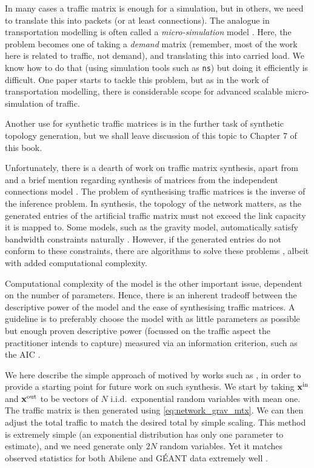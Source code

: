 In many cases a traffic matrix is enough for a simulation, but in others, 
we need to translate this into packets (or at least connections). The analogue in
transportation modelling is often called a {\em micro-simulation}
model \cite{Algers97Micro,Hoogendoorn01Vehicular}. 
Here, the problem becomes one of taking a {\em demand} matrix
(remember, most of the work here is related to traffic, not demand), and
translating this into carried load. We know how to do that (using
simulation tools such as \verb|ns|) but doing it efficiently is
difficult. One paper \cite{sommers11:_effic} starts to tackle this
problem, but as in the work of transportation modelling, there is
considerable scope for advanced scalable micro-simulation of traffic.

Another use for synthetic traffic matrices is in the further task of
synthetic topology generation, but we shall leave discussion of this
topic to Chapter 7 of this book.

Unfortunately, there is a dearth of work on traffic matrix synthesis,
apart from \cite{Nucci05TMSynth,Roughan05GravSynth} and a brief
mention regarding synthesis of matrices from the independent
connections model
\cite{Erramilli06IndepConn,Erramilli06IndepConnTech}. The problem of
synthesising traffic matrices is the inverse of the inference
problem. In synthesis, the topology of the network matters, as the
generated entries of the artificial traffic matrix must not exceed the
link capacity it is mapped to. Some models, such as the gravity model,
automatically satisfy bandwidth constraints naturally
\cite{Roughan05GravSynth}. However, if the generated entries do not
conform to these constraints, there are algorithms to solve these
problems \cite{Nucci05TMSynth}, albeit with added computational 
complexity.

Computational complexity of the model
is the other important issue, dependent on the number of
parameters. Hence, there is an inherent tradeoff between the
descriptive power of the model and the ease of synthesising traffic
matrices. A guideline is to preferably choose the model with as little
parameters as possible but enough proven descriptive power (focussed on
the traffic aspect the practitioner intends to capture) measured
via an information criterion, such as the AIC \cite{Akaike74AIC}.
 
We here describe the simple approach of \cite{Roughan05GravSynth}
motived by works such as \cite{FRT02}, in order to provide a starting
point for future work on such synthesis.  We start by taking $\mathbf{x}^{\rm
  in}$ and $\mathbf{x}^{\rm out}$ to be vectors of $N$ i.i.d.~exponential 
random variables with mean one.
The traffic matrix is then generated using \autoref{eq:network_grav_mtx}. We can
then adjust the total traffic to match the desired total by simple
scaling.  This method is extremely simple (an exponential distribution
has only one parameter to estimate), and we need generate only $2N$
random variables. Yet it matches observed statistics for both Abilene
and G\'{E}ANT data extremely well \cite{Alderson06Topology}.

